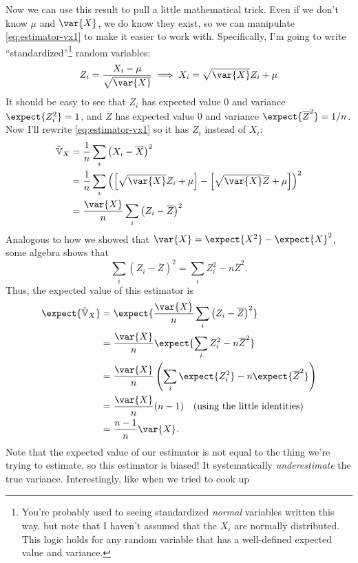Now we can use this result to pull a little mathematical trick. Even if we
don't know $\mu$ and $\var{X}$, we do know they exist, so we can manipulate
\eqref{eq:estimator-vx1} to make it easier to work with. Specifically, I'm
going to write ``standardized''\footnote{You're probably used to seeing
standardized \emph{normal} variables written this way, but note that I haven't
assumed that the $X_i$ are normally distributed. This logic holds for any
random variable that has a well-defined expected value and variance.}
random variables:
\begin{equation}
Z_i = \frac{X_i - \mu}{\sqrt{\var{X}}} \implies X_i = \sqrt{\var{X}} Z_i + \mu
\end{equation}
It should be easy to see that $Z_i$ has expected value 0 and variance $\expect{Z_i^2} = 1$,
and $\overline{Z}$ has expected value
0 and variance $\expect{\overline{Z}^2} = 1/n$. Now I'll rewrite \eqref{eq:estimator-vx1}
so it has $Z_i$ instead of $X_i$:
\begin{align*}
\hat{\mathbb{V}}_X
  &= \frac{1}{n} \sum_i \left( X_i - \overline{X} \right)^2 \\
  &= \frac{1}{n} \sum_i \left( \left[\sqrt{\var{X}} Z_i + \mu\right] - \left[ \sqrt{\var{X}} \overline{Z} + \mu \right] \right)^2 \\
  &= \frac{\var{X}}{n} \sum_i \left( Z_i - \overline{Z} \right)^2
\end{align*}
Analogous to how we showed that $\var{X} = \expect{X^2} - \expect{X}^2$, some
algebra shows that
\begin{equation}
\sum_i \left(Z_i - \overline{Z}\right)^2 = \sum_i Z_i^2 - n \overline{Z}^2.
\end{equation}
Thus, the expected value of this estimator is
\begin{align*}
\expect{\hat{\mathbb{V}}_X}
  &= \expect{\frac{\var{X}}{n} \sum_i \left( Z_i - \overline{Z} \right)^2} \\
  &= \frac{\var{X}}{n} \expect{\sum_i Z_i^2 - n \overline{Z}^2} \\
  &= \frac{\var{X}}{n} \left( \sum_i \expect{Z_i^2} - n \expect{\overline{Z}^2} \right)\\
  &= \frac{\var{X}}{n} (n - 1) \quad\text{(using the little identities)} \\
  &= \frac{n-1}{n} \var{X}.
\end{align*}
Note that the expected value of our estimator is not equal to the thing we're
trying to estimate, so this estimator is biased! It systematically \emph{underestimate}
the true variance. Interestingly, like when we tried to cook up
